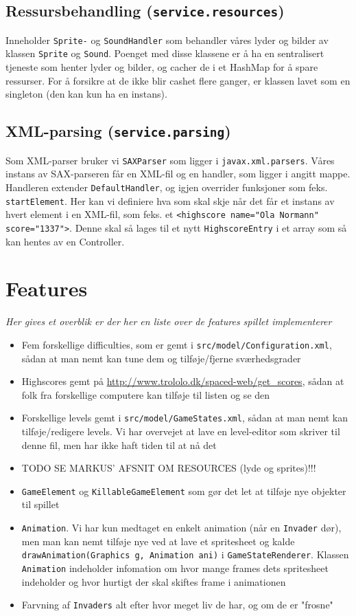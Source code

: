 \documentclass[titlepage,danish]{article}
\newcommand{\code}[1]{\texttt{#1}}
\begin{document}
\subsection{Ressursbehandling (\code{service.resources})}
Inneholder \code{Sprite-} og \code{SoundHandler} som behandler våres lyder og bilder av klassen \code{Sprite} og \code{Sound}. Poenget med disse klassene er å ha en sentralisert tjeneste som henter lyder og bilder, og cacher de i et HashMap for å spare ressurser. For å forsikre at de ikke blir cashet flere ganger, er klassen lavet som en singleton (den kan kun ha en instans).


\subsection{XML-parsing (\code{service.parsing})}
Som XML-parser bruker vi \code{SAXParser} som ligger i \code{javax.xml.parsers}. Våres instans av SAX-parseren får en XML-fil og en handler, som ligger i angitt mappe. Handleren extender \code{DefaultHandler}, og igjen overrider funksjoner som feks. \code{startElement}. Her kan vi definiere hva som skal skje når det får et instans av hvert element i en XML-fil, som feks. et \code{<highscore name="Ola Normann" score="1337">}. Denne skal så lages til et nytt \code{HighscoreEntry} i et array som så kan hentes av en Controller.

\section{Features}
\emph{Her gives et overblik er der her en liste over de features spillet implementerer}

\begin{itemize}
\item Fem forskellige difficulties, som er gemt i \code{src/model/Configuration.xml}, sådan at man
  nemt kan tune dem og tilføje/fjerne sværhedsgrader
\item Highscores gemt på \url{http://www.trololo.dk/spaced-web/get_scores}, sådan at folk fra
  forskellige computere kan tilføje til listen og se den
\item Forskellige levels gemt i \code{src/model/GameStates.xml}, sådan at man nemt kan
  tilføje/redigere levels. Vi har overvejet at lave en level-editor som skriver til denne fil, men
  har ikke haft tiden til at nå det
\item TODO SE MARKUS' AFSNIT OM RESOURCES (lyde og sprites)!!!
\item \code{GameElement} og \code{KillableGameElement} som gør det let at tilføje nye objekter til
  spillet
\item \code{Animation}. Vi har kun medtaget en enkelt animation (når en \code{Invader} dør), men man
  kan nemt tilføje nye ved at lave et spritesheet og kalde \code{drawAnimation(Graphics g, Animation
    ani)} i \code{GameStateRenderer}. Klassen \code{Animation} indeholder infomation om hvor mange
  frames dets spritesheet indeholder og hvor hurtigt der skal skiftes frame i animationen
\item Farvning af \code{Invaders} alt efter hvor meget liv de har, og om de er "frosne"
\end{itemize}
\end{document}
